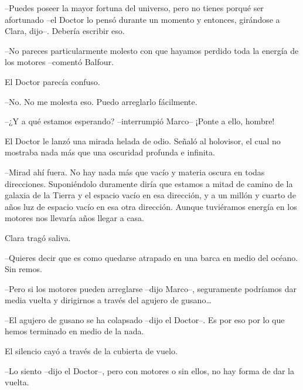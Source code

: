 {--Puedes poseer la mayor fortuna del universo, pero no tienes porqué ser
 afortunado --el Doctor lo pensó durante un momento y entonces, girándose
a Clara, dijo--. Debería escribir eso.}

{--No pareces particularmente molesto con que hayamos perdido toda la
energía de los motores --comentó Balfour.}

{El Doctor parecía confuso.}

{--No. No me molesta eso. Puedo arreglarlo fácilmente.}

{--¿Y a qué estamos esperando? --interrumpió Marco-- ¡Ponte a ello,
hombre!}

{El Doctor le lanzó una mirada helada de odio. Señaló al holovisor, el
cual no mostraba nada más que una oscuridad profunda e infinita.}

{--Mirad ahí fuera. No hay nada más que vacío y materia oscura en todas
 direcciones. Suponiéndolo duramente diría que estamos a mitad de camino
 de la galaxia de la Tierra y el espacio vacío en esa dirección, y a un
 millón y cuarto de años luz de espacio vacío en esa otra dirección.
 Aunque tuviéramos energía en los motores nos llevaría años llegar a
casa.}

{Clara tragó saliva.}

{--Quieres decir que es como quedarse atrapado en una barca en medio del
océano. Sin remos.}

{--Pero si los motores pueden arreglarse --dijo Marco--, seguramente
 podríamos dar media vuelta y dirigirnos a través del agujero de
 gusano\ldots{}}

{--El agujero de gusano se ha colapsado --dijo el Doctor--. Es por eso
por lo que hemos terminado en medio de la nada.}

{El silencio cayó a través de la cubierta de vuelo.}

{--Lo siento --dijo el Doctor--, pero con motores o sin ellos, no hay
 forma de dar la vuelta.}
